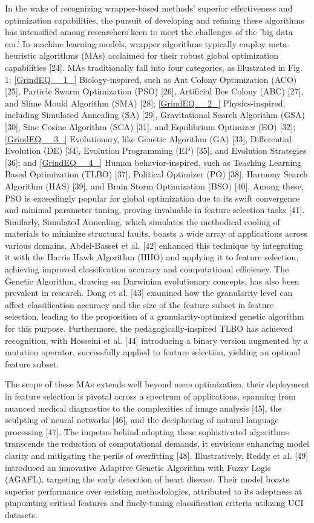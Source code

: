 \documentclass{article} %
\begin{document}
In the wake of recognizing wrapper-based methods' superior effectiveness and optimization capabilities, the pursuit of developing and refining these algorithms has intensified among researchers keen to meet the challenges of the 'big data era.' In machine learning models, wrapper algorithms typically employ meta-heuristic algorithms (MAs) acclaimed for their robust global optimization capabilities [24]. MAs traditionally fall into four categories, as illustrated in Fig. 1: \eqref{GrindEQ__1_} Biology-inspired, such as Ant Colony Optimization (ACO) [25], Particle Swarm Optimization (PSO) [26], Artificial Bee Colony (ABC) [27], and Slime Mould Algorithm (SMA) [28]; \eqref{GrindEQ__2_} Physics-inspired, including Simulated Annealing (SA) [29], Gravitational Search Algorithm (GSA) [30], Sine Cosine Algorithm (SCA) [31], and Equilibrium Optimizer (EO) [32]; \eqref{GrindEQ__3_} Evolutionary, like Genetic Algorithm (GA) [33], Differential Evolution (DE) [34], Evolution Programming (EP) [35], and Evolution Strategies [36]; and \eqref{GrindEQ__4_} Human behavior-inspired, such as Teaching Learning Based Optimization (TLBO) [37], Political Optimizer (PO) [38], Harmony Search Algorithm (HAS) [39], and Brain Storm Optimization (BSO) [40]. Among these, PSO is exceedingly popular for global optimization due to its swift convergence and minimal parameter tuning, proving invaluable in feature selection tasks [41]. Similarly, Simulated Annealing, which simulates the methodical cooling of materials to minimize structural faults, boasts a wide array of applications across various domains. Abdel-Basset et al. [42] enhanced this technique by integrating it with the Harris Hawk Algorithm (HHO) and applying it to feature selection, achieving improved classification accuracy and computational efficiency. The Genetic Algorithm, drawing on Darwinian evolutionary concepts, has also been prevalent in research. Dong et al. [43] examined how the granularity level can affect classification accuracy and the size of the feature subset in feature selection, leading to the proposition of a granularity-optimized genetic algorithm for this purpose. Furthermore, the pedagogically-inspired TLBO has achieved recognition, with Hosseini et al. [44] introducing a binary version augmented by a mutation operator, successfully applied to feature selection, yielding an optimal feature subset.

The scope of these MAs extends well beyond mere optimization, their deployment in feature selection is pivotal across a spectrum of applications, spanning from nuanced medical diagnostics to the complexities of image analysis [45], the sculpting of neural networks [46], and the deciphering of natural language processing [47]. The impetus behind adopting these sophisticated algorithms transcends the reduction of computational demands, it envisions enhancing model clarity and mitigating the perils of overfitting [48]. Illustratively, Reddy et al. [49] introduced an innovative Adaptive Genetic Algorithm with Fuzzy Logic (AGAFL), targeting the early detection of heart disease. Their model boasts superior performance over existing methodologies, attributed to its adeptness at pinpointing critical features and finely-tuning classification criteria utilizing UCI datasets.
\end{document}
